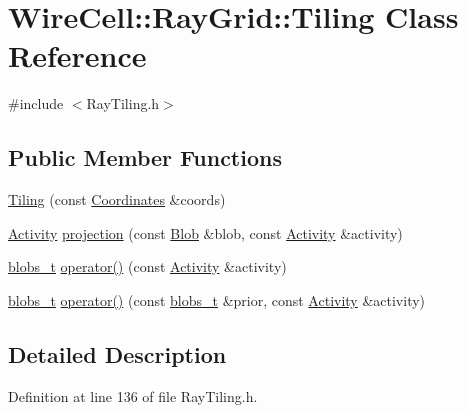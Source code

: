 \hypertarget{class_wire_cell_1_1_ray_grid_1_1_tiling}{}\section{Wire\+Cell\+:\+:Ray\+Grid\+:\+:Tiling Class Reference}
\label{class_wire_cell_1_1_ray_grid_1_1_tiling}


{\ttfamily \#include $<$Ray\+Tiling.\+h$>$}

\subsection*{Public Member Functions}
\begin{DoxyCompactItemize}
\item 
\hyperlink{class_wire_cell_1_1_ray_grid_1_1_tiling_a1a885ef52cc81510e4c593342c7af6fb}{Tiling} (const \hyperlink{class_wire_cell_1_1_ray_grid_1_1_coordinates}{Coordinates} \&coords)
\item 
\hyperlink{class_wire_cell_1_1_ray_grid_1_1_activity}{Activity} \hyperlink{class_wire_cell_1_1_ray_grid_1_1_tiling_a621e1fdb35b900f3eb6dcd2e933b40d9}{projection} (const \hyperlink{class_wire_cell_1_1_ray_grid_1_1_blob}{Blob} \&blob, const \hyperlink{class_wire_cell_1_1_ray_grid_1_1_activity}{Activity} \&activity)
\item 
\hyperlink{namespace_wire_cell_1_1_ray_grid_aea2069aff62790df3241ee7446e81ade}{blobs\+\_\+t} \hyperlink{class_wire_cell_1_1_ray_grid_1_1_tiling_a9ca2b3532778d7582d8166e7b96db7c3}{operator()} (const \hyperlink{class_wire_cell_1_1_ray_grid_1_1_activity}{Activity} \&activity)
\item 
\hyperlink{namespace_wire_cell_1_1_ray_grid_aea2069aff62790df3241ee7446e81ade}{blobs\+\_\+t} \hyperlink{class_wire_cell_1_1_ray_grid_1_1_tiling_a1f7992b6111368304757bd5bab3346e0}{operator()} (const \hyperlink{namespace_wire_cell_1_1_ray_grid_aea2069aff62790df3241ee7446e81ade}{blobs\+\_\+t} \&prior, const \hyperlink{class_wire_cell_1_1_ray_grid_1_1_activity}{Activity} \&activity)
\end{DoxyCompactItemize}


\subsection{Detailed Description}


Definition at line 136 of file Ray\+Tiling.\+h.



